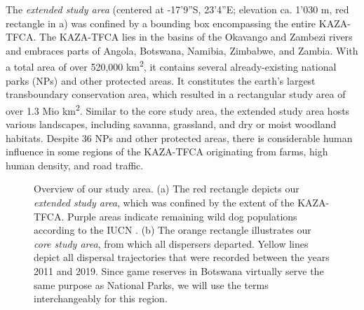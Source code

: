 \documentclass[abstract=on,10pt,a4paper,bibliography=totocnumbered]{scrartcl}
\begin{document}
The \textit{extended study area} (centered at -17'9''S, 23'4''E; elevation ca. 1'030 m, red rectangle in a) was confined
by a bounding box encompassing the entire KAZA-TFCA. The KAZA-TFCA lies in the
basins of the Okavango and Zambezi rivers and embraces parts of Angola,
Botswana, Namibia, Zimbabwe, and Zambia. With a total area of over 520,000
km\textsuperscript{2}, it contains several already-existing national parks (NPs)
and other protected areas. It constitutes the earth's largest transboundary
conservation area, which resulted in a rectangular study area of over 1.3 Mio
km\textsuperscript{2}. Similar to the core study area, the extended study area
hosts various landscapes, including savanna, grassland, and dry or moist
woodland habitats. Despite 36 NPs and other protected areas, there is
considerable human influence in some regions of the KAZA-TFCA originating from
farms, high human density, and road traffic.

\begin{figure}[h]
  \begin{center}
    \caption{Overview of our study area. (a) The red rectangle depicts our
    \textit{extended study area}, which was confined by the extent of the
    KAZA-TFCA. Purple areas indicate remaining wild dog populations according to
    the IUCN \citep{Woodroffe.2012}. (b) The orange rectangle illustrates our
    \textit{core study area}, from which all dispersers departed. Yellow lines
    depict all dispersal trajectories that were recorded between the years 2011
    and 2019. Since game reserves in Botswana virtually serve the same purpose as
    National Parks, we will use the terms interchangeably for this region.}
    \label{StudyArea}
  \end{center}
\end{figure}
\end{document}
